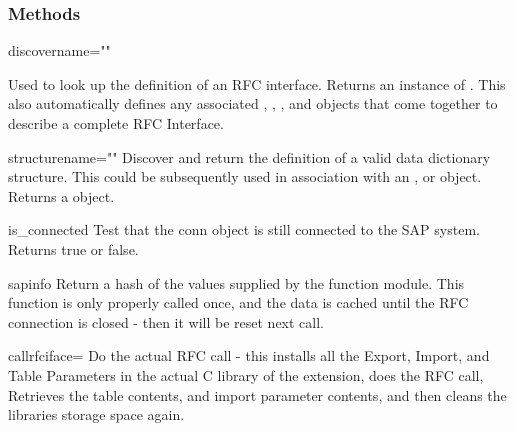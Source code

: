 \documentclass{howto}
\begin{document}
\subsubsection{Methods \label{connmeths}}

\begin{methoddesc}[conn]{discover}{name=""}

Used to look up the definition of an RFC interface.  Returns an instance of .  This also 
automatically defines any associated , , , and  objects
that come together to describe a complete RFC Interface.

\end{methoddesc}



\begin{methoddesc}[conn]{structure}{name=""}
Discover and return the definition of a valid data dictionary structure.  This could be subsequently used in association with an , or  object.  Returns a  object.
\end{methoddesc}


\begin{methoddesc}[conn]{is_connected}{}
Test that the conn object is still connected to the SAP system.  Returns true or false.
\end{methoddesc}


\begin{methoddesc}[conn]{sapinfo}{}
Return a hash of the values supplied by the  function module.  This function is only properly called once, and the data is cached until the RFC connection is closed - then it will be reset next call.
\end{methoddesc}
  

\begin{methoddesc}[conn]{callrfc}{iface=}
Do the actual RFC call - this installs all the Export, Import, and Table Parameters in the actual C library of the extension, does the RFC call, Retrieves the table contents, and import parameter contents, and then cleans the libraries storage space again.
\end{methoddesc}
  
\end{document}
